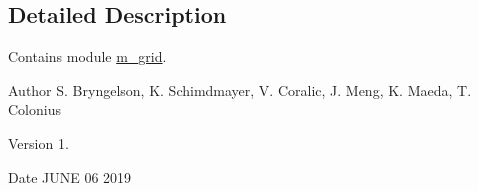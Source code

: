 \subsection{Detailed Description}
Contains module \hyperlink{namespacem__grid}{m\+\_\+grid}. 

\begin{DoxyAuthor}{Author}
S. Bryngelson, K. Schimdmayer, V. Coralic, J. Meng, K. Maeda, T. Colonius 
\end{DoxyAuthor}
\begin{DoxyVersion}{Version}
1. 
\end{DoxyVersion}
\begin{DoxyDate}{Date}
J\+U\+NE 06 2019 
\end{DoxyDate}
